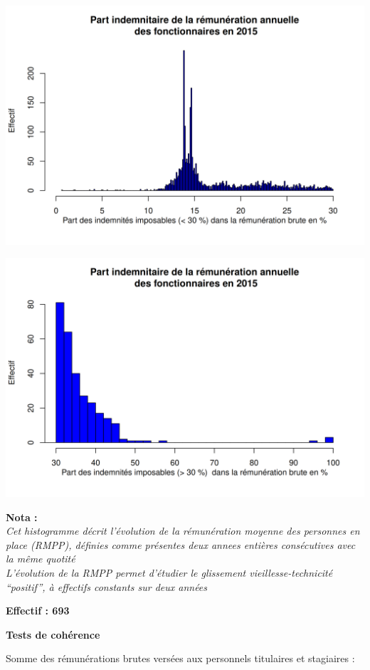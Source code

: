 \includegraphics{altair_files/figure-latex/unnamed-chunk-43-5.png}

\includegraphics{altair_files/figure-latex/unnamed-chunk-43-6.png}

\textbf{Nota :}\\
\emph{Cet histogramme décrit l'évolution de la rémunération moyenne des
personnes en place (RMPP), définies comme présentes deux annees entières
consécutives avec la même quotité}\\
\emph{L'évolution de la RMPP permet d'étudier le glissement
vieillesse-technicité ``positif'', à effectifs constants sur deux
années}

\textbf{Effectif : 693 }

\textbf{Tests de cohérence}

Somme des rémunérations brutes versées aux personnels titulaires et
stagiaires :


